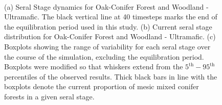 \begin{figure}[!htbp]
  \centering
  \\
  \caption{(a) Seral Stage dynamics for Oak-Conifer Forest and Woodland - Ultramafic. The black vertical line at 40 timesteps marks the end of the equilibration period used in this study. (b) Current seral stage distribution for Oak-Conifer Forest and Woodland - Ultramafic. (c) Boxplots showing the range of variability for each seral stage over the course of the simulation, excluding the equilibration period. Boxplots were modified so that whiskers extend from the $5^{\text{th}} - 95^{\text{th}}$ percentiles of the observed results. Thick black bars in line with the boxplots denote the current proportion of mesic mixed conifer forests in a given seral stage.} 
  \label{fig:covcond_ocfwu}
\end{figure}



